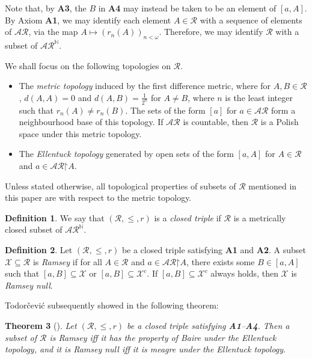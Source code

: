 \documentclass[11pt,reqno]{amsart}
\theoremstyle{plain}
\numberwithin{equation}{section}
\newtheorem{theorem}{Theorem}[section]
\theoremstyle{definition}
\newtheorem{definition}[theorem]{Definition}
\newcommand{\N}{\mathbb{N}}
\newcommand{\cal}{\mathcal}
\newcommand{\restrictedto}{\mathord{\upharpoonright}}
\newcommand{\X}{\cal{X}}
\begin{document}
Note that, by \textbf{A3}, the $B$ in \textbf{A4} may instead be taken to be an element of $[a,A]$. By Axiom \textbf{A1}, we may identify each element $A \in \cal{R}$ with a sequence of elements of $\cal{AR}$, via the map $A \mapsto (r_n(A))_{n<\omega}$. Therefore, we may identify $\cal{R}$ with a subset of $\cal{AR}^\N$.

We shall focus on the following topologies on $\cal{R}$.
\begin{itemize}
    \item The \emph{metric topology} induced by the first difference metric, where for $A,B \in \cal{R}$, $d(A,A) = 0$ and $d(A,B) = \frac{1}{2^n}$ for $A \neq B$, where $n$ is the least integer such that $r_n(A) \neq r_n(B)$. The sets of the form $[a]$ for $a \in \cal{AR}$ form a neighbourhood base of this topology. If $\cal{AR}$ is countable, then $\cal{R}$ is a Polish space under this metric topology.

    \item The \emph{Ellentuck topology} generated by open sets of the form $[a,A]$ for $A \in \cal{R}$ and $a \in \cal{AR}\restrictedto A$.
\end{itemize}
Unless stated otherwise, all topological properties of subsets of $\cal{R}$ mentioned in this paper are with respect to the metric topology.

\begin{definition}
    We say that $(\cal{R},\leq,r)$ is a \emph{closed triple} if $\cal{R}$ is a metrically closed subset of $\cal{AR}^\N$.
\end{definition}

\begin{definition}
    Let $(\cal{R},\leq,r)$ be a closed triple satisfying \textbf{A1} and \textbf{A2}. A subset $\X \subseteq \cal{R}$ is \emph{Ramsey} if for all $A \in \cal{R}$ and $a \in \cal{AR}\restrictedto A$, there exists some $B \in [a,A]$ such that $[a,B] \subseteq \X$ or $[a,B] \subseteq \X^c$. If $[a,B] \subseteq \X^c$ always holds, then $\X$ is \emph{Ramsey null}.
\end{definition}

Todor\v{c}evi\'{c} subsequently showed in \cite{T10} the following theorem:

\begin{theorem}[{\cite[Abstract Ellentuck theorem]{T10}}]
\label{thm:abstract.Ellentuck.thm}
    Let $(\cal{R},\leq,r)$ be a closed triple satisfying \textbf{A1}--\textbf{A4}. Then a subset of $\cal{R}$ is Ramsey iff it has the property of Baire under the Ellentuck topology, and it is Ramsey null iff it is meagre under the Ellentuck topology. 
\end{theorem}
\end{document}
